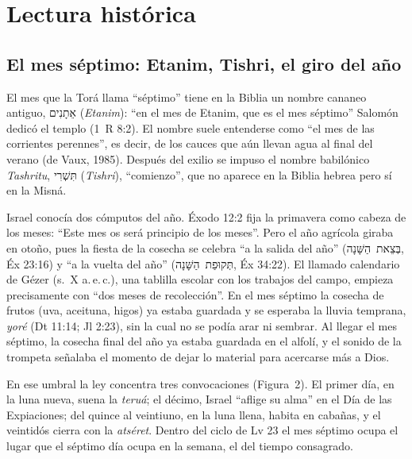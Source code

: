 \documentclass[11pt,letterpaper]{article}
\newcommand{\heb}[1]{\mbox{\foreignlanguage{hebrew}{#1}}}
\begin{document}
\section{Lectura histórica}

\subsection{El mes séptimo: Etanim, Tishri, el giro del año}
El mes que la Torá llama ``séptimo'' tiene en la Biblia un nombre cananeo antiguo, \heb{אֵתָנִים} (\emph{Etanim}): ``en el mes de Etanim, que es el mes séptimo'' Salomón dedicó el templo (1~R 8:2). El nombre suele entenderse como ``el mes de las corrientes perennes'', es decir, de los cauces que aún llevan agua al final del verano (de Vaux, 1985). Después del exilio se impuso el nombre babilónico \emph{Tashritu}, \heb{תִּשְׁרִי} (\emph{Tishri}), ``comienzo'', que no aparece en la Biblia hebrea pero sí en la Misná.

Israel conocía dos cómputos del año. Éxodo 12:2 fija la primavera como cabeza de los meses: ``Este mes os será principio de los meses''. Pero el año agrícola giraba en otoño, pues la fiesta de la cosecha se celebra ``a la salida del año'' (\heb{בְּצֵאת הַשָּׁנָה}, Éx 23:16) y ``a la vuelta del año'' (\heb{תְּקוּפַת הַשָּׁנָה}, Éx 34:22). El llamado calendario de Gézer (s.~X a.\,e.\,c.), una tablilla escolar con los trabajos del campo, empieza precisamente con ``dos meses de recolección''. En el mes séptimo la cosecha de frutos (uva, aceituna, higos) ya estaba guardada y se esperaba la lluvia temprana, \emph{yoré} (Dt 11:14; Jl 2:23), sin la cual no se podía arar ni sembrar. Al llegar el mes séptimo, la cosecha final del año ya estaba guardada en el alfolí, y el sonido de la trompeta señalaba el momento de dejar lo material para acercarse más a Dios.

En ese umbral la ley concentra tres convocaciones (Figura~2). El primer día, en la luna nueva, suena la \emph{teruá}; el décimo, Israel ``aflige su alma'' en el Día de las Expiaciones; del quince al veintiuno, en la luna llena, habita en cabañas, y el veintidós cierra con la \emph{atséret}. Dentro del ciclo de Lv 23 el mes séptimo ocupa el lugar que el séptimo día ocupa en la semana, el del tiempo consagrado.
\end{document}
